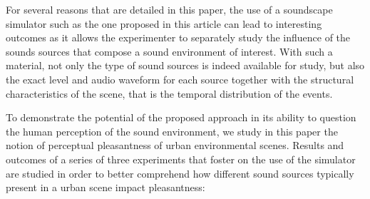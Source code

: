 \documentclass[twoside,twocolumn]{article}
\begin{document}
For several reasons that are detailed in this paper, the use of a soundscape simulator such as the one proposed in this article can lead to interesting outcomes as it allows the experimenter to separately study  the influence of the sounds sources that compose a sound environment of interest. With such a material, not only the type of sound sources is indeed available for study, but also the exact level and audio waveform for each source together with the structural characteristics of the scene, that is the temporal distribution of the events.



To demonstrate the potential of the proposed approach in its ability to question the human perception of the sound environment, we study in this paper the notion of perceptual pleasantness of urban environmental scenes. Results and outcomes of a series of three experiments that foster on the use of the simulator are studied in order to better comprehend how different sound sources typically present in a urban scene impact pleasantness:

\end{document}

